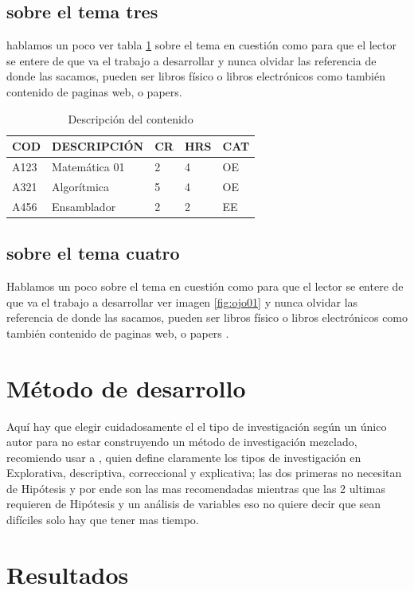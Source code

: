\documentclass[a4paper,12pt]{report}
\begin{document}
\subsection{sobre el tema tres}
hablamos un poco ver tabla \ref{tbl:tabla01} sobre el tema en cuestión como para que el lector se entere de que va el trabajo a desarrollar y nunca olvidar las referencia de donde las sacamos, pueden ser libros físico o libros electrónicos como también contenido de paginas web, o papers.

\begin{table}[ht]
\centering
\caption{Descripción del contenido}
\label{tbl:tabla01}
\begin{tabular}{@{}lllll@{}}
\hline
COD  & DESCRIPCIÓN   & CR & HRS & CAT \\ \hline
A123 & Matemática 01 & 2  & 4   & OE  \\
A321 & Algorítmica   & 5  & 4   & OE  \\
A456 & Ensamblador   & 2  & 2   & EE  \\ \hline
\end{tabular}
\end{table}

\subsection{sobre el tema cuatro}
Hablamos un poco sobre el tema en cuestión como para que el lector se entere de que va el trabajo a desarrollar ver imagen \ref{fig:ojo01} y nunca olvidar las referencia de donde las sacamos, pueden ser libros físico o libros electrónicos como también contenido de paginas web, o papers \cite{wikiRed}.

\section{Método de desarrollo}
Aquí hay que elegir cuidadosamente el el tipo de investigación según un único autor para no estar construyendo un método de investigación mezclado, recomiendo usar a \citep{sampieri} , quien define claramente los tipos de investigación en Explorativa, descriptiva, correccional y explicativa; las dos primeras no necesitan de Hipótesis y por ende son las mas recomendadas mientras que las 2 ultimas requieren de Hipótesis y un análisis de variables eso no quiere decir que sean difíciles solo hay que tener mas tiempo.
\section{Resultados}
\end{document}
